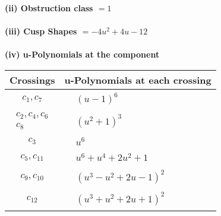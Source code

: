 \documentclass[1p]{elsarticle_modified}
\theoremstyle{definition}
\begin{document}
\flushleft \textbf{(ii) Obstruction class $= 1$}\\~\\
\flushleft \textbf{(iii) Cusp Shapes $= -4 u^2+4 u-12$}\\~\\
\newpage\renewcommand{\arraystretch}{1}
\flushleft \textbf{(iv) u-Polynomials at the component}\newline \\
\begin{tabular}{m{50pt}|m{274pt}}
Crossings & \hspace{64pt}u-Polynomials at each crossing \\
\hline $$\begin{aligned}c_{1},c_{7}\end{aligned}$$&$\begin{aligned}
&(u-1)^6
\end{aligned}$\\
\hline $$\begin{aligned}c_{2},c_{4},c_{6}\\c_{8}\end{aligned}$$&$\begin{aligned}
&(u^2+1)^3
\end{aligned}$\\
\hline $$\begin{aligned}c_{3}\end{aligned}$$&$\begin{aligned}
&u^6
\end{aligned}$\\
\hline $$\begin{aligned}c_{5},c_{11}\end{aligned}$$&$\begin{aligned}
&u^6+u^4+2 u^2+1
\end{aligned}$\\
\hline $$\begin{aligned}c_{9},c_{10}\end{aligned}$$&$\begin{aligned}
&(u^3- u^2+2 u-1)^2
\end{aligned}$\\
\hline $$\begin{aligned}c_{12}\end{aligned}$$&$\begin{aligned}
&(u^3+u^2+2 u+1)^2
\end{aligned}$\\
\hline
\end{tabular}\\~\\
\end{document}
